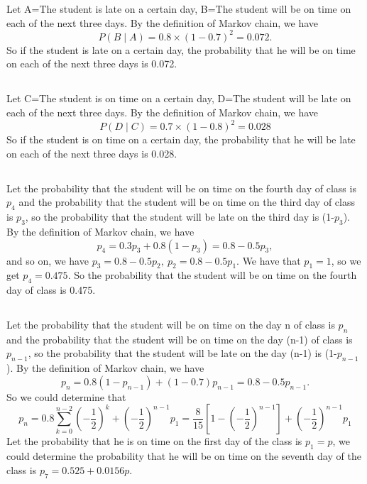 \documentclass[10.5pt]{article}
\begin{document}
\section{}
\subsection{}
Let A={The student is late on a certain day}, B={The student will be on time on each of the next three days}. By the definition of Markov chain, we have $$P(B\mid A) = 0.8\times (1-0.7)^2 = 0.072.$$\indent
So if the student is late on a certain day, the probability that he will be on time on each of the next three days is 0.072.
\subsection{}
Let C={The student is on time on a certain day}, D={The student will be late on each of the next three days}. By the definition of Markov chain, we have $$P(D\mid C) = 0.7\times (1-0.8)^2 = 0.028$$\indent
So if the student is on time on a certain day, the probability that he will be late on each of the next three days is 0.028.
\subsection{}
Let the probability that the student will be on time on the fourth day of class is $p_4$ and the probability that the student will be on time on the third day of class is $p_3$, so the probability that the student will be late on the third day is (1-$p_3$). By the definition of Markov chain, we have $$p_4 = 0.3p_3 + 0.8(1-p_3) = 0.8-0.5p_3,$$ and so on, we have $p_3 = 0.8 - 0.5p_2, ~p_2=0.8-0.5p_1$. We have that $p_1=1$, so we get $p_4 = 0.475$. So the probability that the student will be on time on the fourth day of class is 0.475.
\subsection{}
Let the probability that the student will be on time on the day n of class is $p_n$ and the probability that the student will be on time on the day (n-1) of class is $p_{n-1}$, so the probability that the student will be late on the day (n-1) is (1-$p_{n-1}$). By the definition of Markov chain, we have $$p_n = 0.8(1-p_{n-1}) + (1-0.7)p_{n-1} = 0.8-0.5p_{n-1}.$$\indent
So we could determine that $$p_n = 0.8\sum_{k=0}^{n-2} \left(-\frac{1}{2}\right)^k + \left(-\frac{1}{2}\right)^{n-1}p_1 = \frac{8}{15}\left[1-\left(-\frac{1}{2}\right)^{n-1}\right] + \left(-\frac{1}{2}\right)^{n-1}p_1$$\indent
Let the probability that he is on time on the first day of the class is $p_1 = p$, we could determine the probability that he will be on time on the seventh day of the class is $p_7 = 0.525+0.0156p$.
\end{document}
